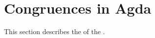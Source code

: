 \documentclass[a4paper,UKenglish,cleveref, autoref, thm-restate]{lipics-v2019}
\begin{document}
\begin{code}%
%
\>[1]\AgdaSpace{}%
\AgdaSymbol{:}\AgdaSpace{}%
\AgdaSpace{}%
\AgdaSpace{}%
\AgdaSpace{}%
\AgdaSpace{}%
\AgdaSpace{}%
\AgdaSpace{}%
\AgdaSpace{}%
\AgdaSpace{}%
\AgdaSpace{}%
\AgdaSpace{}%
\<%
\\
%
\>[1]\AgdaSpace{}%
\AgdaSpace{}%
\AgdaSpace{}%
\AgdaSymbol{=}\AgdaSpace{}%
\AgdaSpace{}%
\AgdaSpace{}%
\AgdaSpace{}%
\AgdaSymbol{(}\AgdaSpace{}%
\AgdaSpace{}%
\AgdaSpace{}%
\AgdaSpace{}%
\AgdaSymbol{)}\AgdaSpace{}%
\AgdaFunction{,}\AgdaSpace{}%
\AgdaSpace{}%
\<%
\end{code}



\section{Congruences in Agda}\label{sec:cons-in-agda}
This section describes the \consmodule of the \agdaualib.

\end{document}
